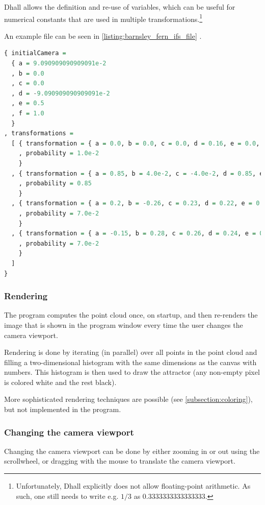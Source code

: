 \documentclass[11pt]{article}
\begin{document}
Dhall allows the definition and re-use of variables, which can be useful
for numerical constants that are used in multiple transformations.\footnote{Unfortunately, Dhall explicitly does not allow floating-point arithmetic.
As such, one still needs to write e.g. \(1/3\) as \(0.3333333333333333\).}

An example file can be seen in \autoref{listing:barnsley_fern_ifs_file} .


\begin{lstlisting}[float, language=Haskell, frame=single, breaklines=true, basicstyle=\scriptsize\tt, captionpos=b, caption={barnsley\_fern.ifs, representing \autoref{ifs:barnsley_fern}}, label={listing:barnsley_fern_ifs_file}]
{ initialCamera =
  { a = 9.090909090909091e-2
  , b = 0.0
  , c = 0.0
  , d = -9.090909090909091e-2
  , e = 0.5
  , f = 1.0
  }
, transformations =
  [ { transformation = { a = 0.0, b = 0.0, c = 0.0, d = 0.16, e = 0.0, f = 0.0 }
    , probability = 1.0e-2
    }
  , { transformation = { a = 0.85, b = 4.0e-2, c = -4.0e-2, d = 0.85, e = 0.0, f = 1.6 }
    , probability = 0.85
    }
  , { transformation = { a = 0.2, b = -0.26, c = 0.23, d = 0.22, e = 0.0, f = 1.6 }
    , probability = 7.0e-2
    }
  , { transformation = { a = -0.15, b = 0.28, c = 0.26, d = 0.24, e = 0.0, f = 0.44 }
    , probability = 7.0e-2
    }
  ]
}

\end{lstlisting}

\subsubsection{Rendering}
\label{sec:org4507a57}
The program computes the point cloud once, on startup, and then re-renders the image that is shown in the program window
every time the user changes the camera viewport.

Rendering is done by iterating (in parallel) over all points in the point cloud and filling a two-dimensional histogram with the same dimensions
as the canvas with numbers. 
This histogram is then used to draw the attractor (any non-empty pixel is colored white and the rest black).

More sophisticated rendering techniques are possible (see \autoref{subsection:coloring}), 
but not implemented in the program.

\subsubsection{Changing the camera viewport}
\label{sec:orgb079939}
Changing the camera viewport can be done by either zooming in or out using the scrollwheel,
or dragging with the mouse to translate the camera viewport.
\end{document}
